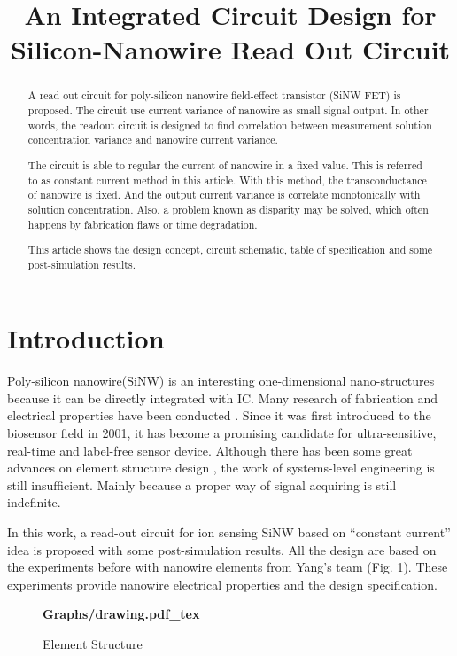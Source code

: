 \documentclass{article}
\title{An Integrated Circuit Design for Silicon-Nanowire Read Out Circuit}
\begin{document}
%
\maketitle
%
\begin{abstract}
A read out circuit for poly-silicon nanowire field-effect transistor (SiNW FET) is proposed.
The circuit use current variance of nanowire as small signal output.
In other words, the readout circuit is designed to find correlation between measurement solution concentration variance and nanowire current variance.

The circuit is able to regular the current of nanowire in a fixed value.
This is referred to as constant current method in this article.
With this method, the transconductance of nanowire is fixed. And the output current variance is correlate monotonically with solution concentration.
Also, a problem known as disparity may be solved, which often happens by fabrication flaws or time degradation.

This article shows the design concept, circuit schematic, table of specification and some post-simulation results.
\end{abstract}
%
\section{Introduction}
\label{sec:intro}

Poly-silicon nanowire(SiNW) is an interesting one-dimensional nano-structures because it can be directly integrated with IC.
Many research of fabrication and electrical properties have been conducted \cite{J1}.
Since it was first introduced to the biosensor field in 2001\cite{J2}, it has become a promising candidate for ultra-sensitive, real-time and label-free  sensor device.
Although there has been some great advances on element structure design \cite{J3}, the work of systems-level engineering is still insufficient.
Mainly because a proper way of signal acquiring is still indefinite.

In this work, a read-out circuit for ion sensing SiNW based on “constant current” idea is proposed with some post-simulation results.
All the design are based on the experiments before with nanowire elements from Yang's team (Fig. 1\cite{J7}).
These experiments provide nanowire electrical properties and the design specification.



\begin{figure}[b]
    \centering
    {\selectfont\textbf{
        \def\svgwidth{5.0cm}
        \fontsize{6}{7}\selectfont
         {Graphs/drawing.pdf_tex}
    }}
    \fontsize{6}{7}\selectfont
    \caption{Element Structure}
    \label{fig:res}
\end{figure}
\end{document}
